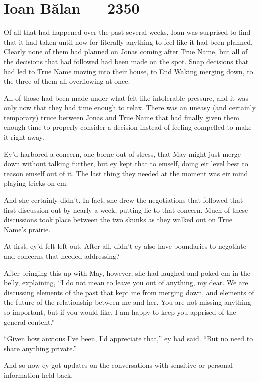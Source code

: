 \hypertarget{ioan-bux103lan-2350}{%
\chapter{Ioan Bălan — 2350}\label{ioan-bux103lan-2350}}

Of all that had happened over the past several weeks, Ioan was surprised to find that it had taken until now for literally anything to feel like it had been planned. Clearly none of them had planned on Jonas coming after True Name, but all of the decisions that had followed had been made on the spot. Snap decisions that had led to True Name moving into their house, to End Waking merging down, to the three of them all overflowing at once.

All of those had been made under what felt like intolerable pressure, and it was only now that they had time enough to relax. There was an uneasy (and certainly temporary) truce between Jonas and True Name that had finally given them enough time to properly consider a decision instead of feeling compelled to make it right away.

Ey'd harbored a concern, one borne out of stress, that May might just merge down without talking further, but ey kept that to emself, doing eir level best to reason emself out of it. The last thing they needed at the moment was eir mind playing tricks on em.

And she certainly didn't. In fact, she drew the negotiations that followed that first discussion out by nearly a week, putting lie to that concern. Much of these discussions took place between the two skunks as they walked out on True Name's prairie.

At first, ey'd felt left out. After all, didn't ey also have boundaries to negotiate and concerns that needed addressing?

After bringing this up with May, however, she had laughed and poked em in the belly, explaining, ``I do not mean to leave you out of anything, my dear. We are discussing elements of the past that kept me from merging down, and elements of the future of the relationship between me and her. You are not missing anything so important, but if you would like, I am happy to keep you apprised of the general content.''

``Given how anxious I've been, I'd appreciate that,'' ey had said. ``But no need to share anything private.''

And so now ey got updates on the conversations with sensitive or personal information held back.


